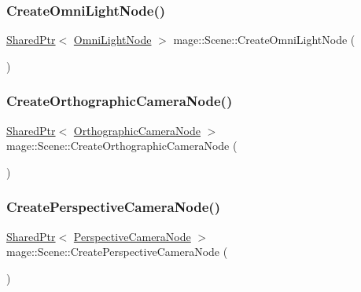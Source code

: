 \subsubsection{\texorpdfstring{Create\+Omni\+Light\+Node()}{CreateOmniLightNode()}}
{\footnotesize\ttfamily \hyperlink{namespacemage_a1e01ae66713838a7a67d30e44c67703e}{Shared\+Ptr}$<$ \hyperlink{namespacemage_a1724c6e6b6b5ba535cdd967cbbb4a669}{Omni\+Light\+Node} $>$ mage\+::\+Scene\+::\+Create\+Omni\+Light\+Node (\begin{DoxyParamCaption}{ }\end{DoxyParamCaption})}

\hypertarget{classmage_1_1_scene_a9ed9e3a611434f62427c7bd4c16d2456}{}\label{classmage_1_1_scene_a9ed9e3a611434f62427c7bd4c16d2456} 
\subsubsection{\texorpdfstring{Create\+Orthographic\+Camera\+Node()}{CreateOrthographicCameraNode()}}
{\footnotesize\ttfamily \hyperlink{namespacemage_a1e01ae66713838a7a67d30e44c67703e}{Shared\+Ptr}$<$ \hyperlink{namespacemage_a7d62ab5877be3e14a9735014b77d3f55}{Orthographic\+Camera\+Node} $>$ mage\+::\+Scene\+::\+Create\+Orthographic\+Camera\+Node (\begin{DoxyParamCaption}{ }\end{DoxyParamCaption})}

\hypertarget{classmage_1_1_scene_a3f4141d407133e6419af92376bc3ecc1}{}\label{classmage_1_1_scene_a3f4141d407133e6419af92376bc3ecc1} 
\subsubsection{\texorpdfstring{Create\+Perspective\+Camera\+Node()}{CreatePerspectiveCameraNode()}}
{\footnotesize\ttfamily \hyperlink{namespacemage_a1e01ae66713838a7a67d30e44c67703e}{Shared\+Ptr}$<$ \hyperlink{namespacemage_ad6f2ef4a25873e73e8fa38b06425939f}{Perspective\+Camera\+Node} $>$ mage\+::\+Scene\+::\+Create\+Perspective\+Camera\+Node (\begin{DoxyParamCaption}{ }\end{DoxyParamCaption})}

